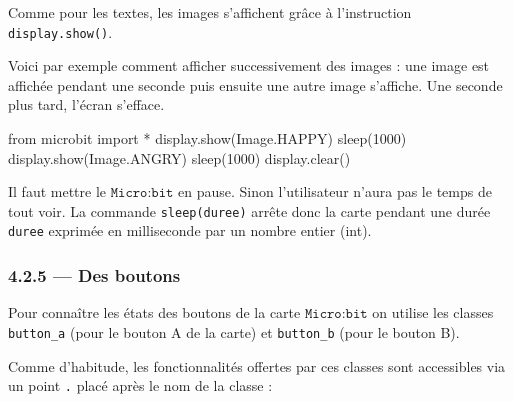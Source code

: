 \documentclass[a4paper,17pt]{extarticle}
\newenvironment{Shaded}{}{}
\newcommand{\DecValTok}[1]{\textcolor[rgb]{0.25,0.63,0.44}{{#1}}}
\newcommand{\NormalTok}[1]{{#1}}
\newcommand{\ImportTok}[1]{{#1}}
\newcommand{\OperatorTok}[1]{\textcolor[rgb]{0.40,0.40,0.40}{{#1}}}
\begin{document}
Comme pour les textes, les images s'affichent grâce à l'instruction
\texttt{display.show()}.
\begin{exemple}
    Voici par exemple comment afficher successivement des images : une image
est affichée pendant une seconde puis ensuite une autre image s'affiche.
Une seconde plus tard, l'écran s'efface.

\begin{Shaded}
\begin{Highlighting}[]
\ImportTok{from}\NormalTok{ microbit }\ImportTok{import} \OperatorTok{*}
\NormalTok{display.show(Image.HAPPY)}
\NormalTok{sleep(}\DecValTok{1000}\NormalTok{)}
\NormalTok{display.show(Image.ANGRY)}
\NormalTok{sleep(}\DecValTok{1000}\NormalTok{)}
\NormalTok{display.clear()}
\end{Highlighting}
\end{Shaded}

Il faut mettre le \(\texttt{Micro:bit}\) en pause. Sinon l'utilisateur
n'aura pas le temps de tout voir. La commande \texttt{sleep(duree)}
arrête donc la carte pendant une durée \texttt{duree} exprimée en
milliseconde par un nombre entier (int).

        \end{exemple}
    \hypertarget{des-boutons}{%
\subsubsection{4.2.5 --- Des boutons}\label{des-boutons}}

    Pour connaître les états des boutons de la carte \(\texttt{Micro:bit}\)
on utilise les classes \texttt{button\_a} (pour le bouton A de la carte)
et \texttt{button\_b} (pour le bouton B).

Comme d'habitude, les fonctionnalités offertes par ces classes sont
accessibles via un point \texttt{\textquotesingle{}.\textquotesingle{}}
placé après le nom de la classe :
\end{document}
